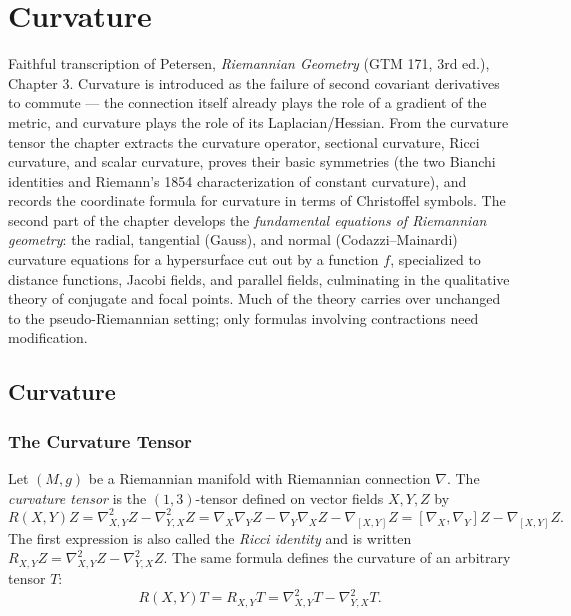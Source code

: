 \chapter{Curvature}
\label{chap:pet-curvature}

Faithful transcription of Petersen, \emph{Riemannian Geometry} (GTM 171, 3rd ed.),
Chapter 3. Curvature is introduced as the failure of second covariant derivatives to
commute — the connection itself already plays the role of a gradient of the metric,
and curvature plays the role of its Laplacian/Hessian. From the curvature tensor the
chapter extracts the curvature operator, sectional curvature, Ricci curvature, and
scalar curvature, proves their basic symmetries (the two Bianchi identities and
Riemann's 1854 characterization of constant curvature), and records the coordinate
formula for curvature in terms of Christoffel symbols. The second part of the
chapter develops the \emph{fundamental equations of Riemannian geometry}: the
radial, tangential (Gauss), and normal (Codazzi--Mainardi) curvature equations for
a hypersurface cut out by a function $f$, specialized to distance functions,
Jacobi fields, and parallel fields, culminating in the qualitative theory of
conjugate and focal points. Much of the theory carries over unchanged to the
pseudo-Riemannian setting; only formulas involving contractions need modification.

\section{Curvature}

\subsection{The Curvature Tensor}

\begin{definition}
  \label{def:pet-ch3-curvature-tensor}
  \leanok
  Let $(M,g)$ be a Riemannian manifold with Riemannian connection $\nabla$. The
  \emph{curvature tensor} is the $(1,3)$-tensor defined on vector fields $X,Y,Z$ by
  \[
    R(X,Y)Z=\nabla^2_{X,Y}Z-\nabla^2_{Y,X}Z
    =\nabla_X\nabla_YZ-\nabla_Y\nabla_XZ-\nabla_{[X,Y]}Z
    =[\nabla_X,\nabla_Y]Z-\nabla_{[X,Y]}Z.
  \]
  The first expression is also called the \emph{Ricci identity} and is written
  $R_{X,Y}Z=\nabla^2_{X,Y}Z-\nabla^2_{Y,X}Z$. The same formula defines the
  curvature of an arbitrary tensor $T$:
  \[
    R(X,Y)T=R_{X,Y}T=\nabla^2_{X,Y}T-\nabla^2_{Y,X}T.
  \]
\end{definition}

